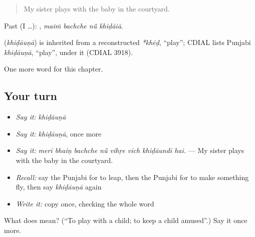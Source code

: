 \begin{quote}
My sister plays with the baby in the courtyard.
\end{quote}

Past (I …):    , \emph{maiṁ bachche nū̃ khiḍāiā}.

\begin{cousinweb}
\textbf{} (\emph{khiḍāuṇā}) is inherited from a reconstructed \emph{*khēḍ}, \textquotedblleft{}play\textquotedblright{}; CDIAL lists Punjabi \emph{khiḍāuṇā}, \textquotedblleft{}play\textquotedblright{}, under it (CDIAL 3918).
\end{cousinweb}

\begin{grammarlens}[title={What you've built}]
One more word for this chapter.
\end{grammarlens}

\subsection*{Your turn}
\begin{itemize}
\raggedright
  \item \emph{Say it:} \emph{khiḍāuṇā}
  \item \emph{Say it:} \emph{khiḍāuṇā}, once more
  \item \emph{Say it:} \emph{merī bhaiṇ bachche nū̃ vihṛe vich khiḍāundī hai.} — My sister plays with the baby in the courtyard.
  \item \emph{Recall:} say the Punjabi for to leap, then the Punjabi for to make something fly, then say \emph{khiḍāuṇā} again
  \item \emph{Write it:} copy \textbf{} once, checking the whole word
\end{itemize}

\begin{tcolorbox}[breakable,colback=teal!4,colframe=teal!35!black,title={Before you move on}]
What does  mean? (\textquotedblleft{}To play with a child; to keep a child amused\textquotedblright{}.) Say it once more.
\end{tcolorbox}
